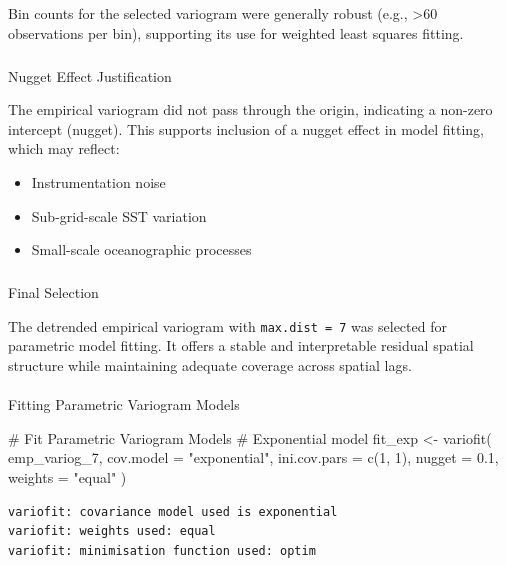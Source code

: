 \documentclass[
  11pt,
]{article}
\makeatletter
\let\oldparagraph\paragraph
\renewcommand{\paragraph}{
    \@ifstar
      \xxxParagraphStar
      \xxxParagraphNoStar
  }
\newcommand{\xxxParagraphStar}[1]{\oldparagraph*{#1}\mbox{}}
\newcommand{\xxxParagraphNoStar}[1]{\oldparagraph{#1}\mbox{}}
\let\oldsubparagraph\subparagraph
\renewcommand{\subparagraph}{
    \@ifstar
      \xxxSubParagraphStar
      \xxxSubParagraphNoStar
  }
\newcommand{\xxxSubParagraphStar}[1]{\oldsubparagraph*{#1}\mbox{}}
\newcommand{\xxxSubParagraphNoStar}[1]{\oldsubparagraph{#1}\mbox{}}
\newenvironment{Shaded}{\begin{snugshade}}{\end{snugshade}}
\newcommand{\AttributeTok}[1]{\textcolor[rgb]{0.40,0.45,0.13}{#1}}
\newcommand{\CommentTok}[1]{\textcolor[rgb]{0.37,0.37,0.37}{#1}}
\newcommand{\DecValTok}[1]{\textcolor[rgb]{0.68,0.00,0.00}{#1}}
\newcommand{\FloatTok}[1]{\textcolor[rgb]{0.68,0.00,0.00}{#1}}
\newcommand{\FunctionTok}[1]{\textcolor[rgb]{0.28,0.35,0.67}{#1}}
\newcommand{\NormalTok}[1]{\textcolor[rgb]{0.00,0.23,0.31}{#1}}
\newcommand{\OtherTok}[1]{\textcolor[rgb]{0.00,0.23,0.31}{#1}}
\newcommand{\StringTok}[1]{\textcolor[rgb]{0.13,0.47,0.30}{#1}}
\makeatother
\begin{document}
Bin counts for the selected variogram were generally robust (e.g.,
\textgreater60 observations per bin), supporting its use for weighted
least squares fitting.

\subparagraph{Nugget Effect
Justification}\label{nugget-effect-justification}

The empirical variogram did not pass through the origin, indicating a
non-zero intercept (nugget). This supports inclusion of a nugget effect
in model fitting, which may reflect:

\begin{itemize}
\item
  Instrumentation noise
\item
  Sub-grid-scale SST variation
\item
  Small-scale oceanographic processes
\end{itemize}

\subparagraph{Final Selection}\label{final-selection}

The detrended empirical variogram with \texttt{max.dist\ =\ 7} was
selected for parametric model fitting. It offers a stable and
interpretable residual spatial structure while maintaining adequate
coverage across spatial lags.

\paragraph{Fitting Parametric Variogram
Models}\label{fitting-parametric-variogram-models}

\begin{Shaded}
\begin{Highlighting}[]
\CommentTok{\#  Fit Parametric Variogram Models}
\CommentTok{\# Exponential model}
\NormalTok{fit\_exp }\OtherTok{\textless{}{-}} \FunctionTok{variofit}\NormalTok{(}
\NormalTok{  emp\_variog\_7,}
  \AttributeTok{cov.model =} \StringTok{"exponential"}\NormalTok{,}
  \AttributeTok{ini.cov.pars =} \FunctionTok{c}\NormalTok{(}\DecValTok{1}\NormalTok{, }\DecValTok{1}\NormalTok{),}
  \AttributeTok{nugget =} \FloatTok{0.1}\NormalTok{,}
  \AttributeTok{weights =} \StringTok{"equal"}
\NormalTok{)}
\end{Highlighting}
\end{Shaded}

\begin{verbatim}
variofit: covariance model used is exponential 
variofit: weights used: equal 
variofit: minimisation function used: optim 
\end{verbatim}
\end{document}
